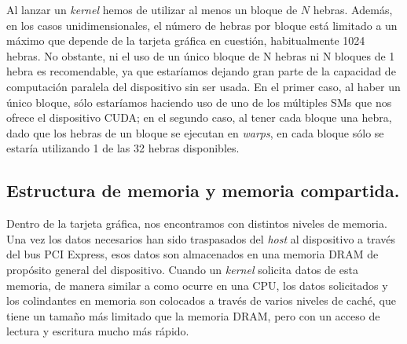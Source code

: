 Al lanzar un \textit{kernel} hemos de utilizar al menos un bloque de $N$ hebras. Además, en los casos unidimensionales, el número de hebras por bloque está limitado a un máximo que depende de la tarjeta gráfica en cuestión, habitualmente 1024 hebras. No obstante, ni el uso de un único bloque de N hebras ni N bloques de 1 hebra es recomendable, ya que estaríamos dejando gran parte de la capacidad de computación paralela del dispositivo \cuda sin ser usada. En el primer caso, al haber un único bloque, sólo estaríamos haciendo uso de uno de los múltiples SMs que nos ofrece el dispositivo CUDA; en el segundo caso, al tener cada bloque una hebra, dado que los hebras de un bloque se ejecutan en \textit{warps}, en cada bloque sólo se estaría utilizando 1 de las 32 hebras disponibles. 


\subsection{Estructura de memoria y memoria compartida.}
Dentro de la tarjeta gráfica, nos encontramos con distintos niveles de memoria. Una vez los datos necesarios han sido traspasados del \textit{host} al dispositivo a través del bus PCI Express, esos datos son almacenados en una memoria DRAM de propósito general del dispositivo. Cuando un \textit{kernel} solicita datos de esta memoria, de manera similar a como ocurre en una CPU, los datos solicitados y los colindantes en memoria son colocados a través de varios niveles de caché, que tiene un tamaño más limitado que la memoria DRAM, pero con un acceso de lectura y escritura mucho más rápido.\\

